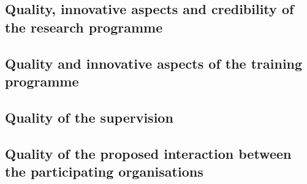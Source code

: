 \documentclass[11pt,a4paper]{article}
\begin{document}
\subsection{Quality, innovative aspects and credibility of the research programme}

%
\processdelayedfloats
%


\subsection{Quality and innovative aspects of the training programme}
\label{sec:training}
\label{sub:trainingOverview}

\processdelayedfloats


\vspace{-2mm}
\subsection{Quality of the supervision}
\label{sec:supervision}

\processdelayedfloats



%
%
\vspace{-2mm}
\subsection{Quality of the proposed interaction between the participating organisations}

\label{sec:qualityInteraction}
\processdelayedfloats


%
\vspace{-2mm}
\end{document}
